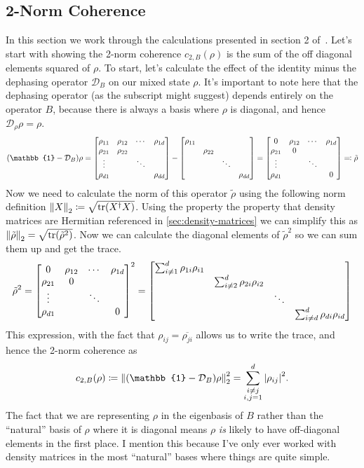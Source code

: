 \documentclass[11pt,english]{article}
\theoremstyle{definition}
\newcommand{\twonorm}[1][\rho]{c_{2,B} (#1)}
\newcommand{\dephase}{\mathcal{D}_B}
\begin{document}
\subsection{2-Norm Coherence}
In this section we work through the calculations presented in section 2 of~\cite{dynamic-entropies}.
Let's start with showing the 2-norm coherence $\twonorm{}$ is the sum of the off diagonal elements squared of $\rho$.
To start, let's calculate the effect of the identity minus the dephasing operator $\dephase$ on our mixed state $\rho$.
It's important to note here that the dephasing operator (as the subscript might suggest) depends entirely on the operator $B$, because there is always a basis where $\rho$ is diagonal, and hence $\mathcal{D}_\rho\rho = \rho$.
\begin{equation*}
	\qty(\mathbb{1} - \dephase)\rho = \mqty[\rho_{11} & \rho_{12} & \cdots & \rho_{1d} \\ \rho_{21} & \rho_{22} & & \\ \vdots & & \ddots & \\ \rho_{d1} & & & \rho_{dd}] - \mqty[\diagonalmatrix{\rho_{11},\rho_{22},\ddots,\rho_{dd}}] = \mqty[0 & \rho_{12} & \cdots & \rho_{1d} \\ \rho_{21} & 0 & & \\ \vdots & & \ddots & \\ \rho_{d1} & & & 0] \eqqcolon \tilde{\rho}
\end{equation*}
Now we need to calculate the norm of this operator $\tilde{\rho}$ using the following norm definition $\norm{X}_2 \coloneqq \sqrt{\tr(X^\dagger X)}$.
Using the property the property that density matrices are Hermitian referenced in \cref{sec:density-matrices} we can simplify this as $\norm{\tilde{\rho}}_2 = \sqrt{\tr(\tilde{\rho}^2)}$.
Now we can calculate the diagonal elements of $\tilde{\rho}^2$ so we can sum them up and get the trace.
\begin{equation*}
	\tilde{\rho}^2 = \mqty[0 & \rho_{12} & \cdots & \rho_{1d} \\ \rho_{21} & 0 & & \\ \vdots & & \ddots & \\ \rho_{d1} & & & 0]^2  = \mqty[\dmat{\sum_{i \neq 1 }^d\rho_{1i}\rho_{i1},\sum_{i \neq 2}^d\rho_{2i}\rho_{i2},\ddots, \sum_{i \neq d}^d\rho_{di}\rho_{id}}]
\end{equation*}
This expression, with the fact that $\rho_{ij} = \overline{\rho_{ji}}$ allows us to write the trace, and hence the 2-norm coherence as
\begin{equation}\label{eq:2norm}
	\twonorm{} \coloneqq\norm{\qty(\mathbb{1} - \dephase)\rho}_2^2 = \sum_{\substack{i\neq j \\ i,j = 1}}^d\abs{\rho_{ij}}^2.
\end{equation}
The fact that we are representing $\rho$ in the eigenbasis of $B$ rather than the ``natural'' basis of $\rho$ where it is diagonal means $\rho$ \emph{is} likely to have off-diagonal elements in the first place. I mention this because I've only ever worked with density matrices in the most ``natural'' bases where things are quite simple.
\end{document}

